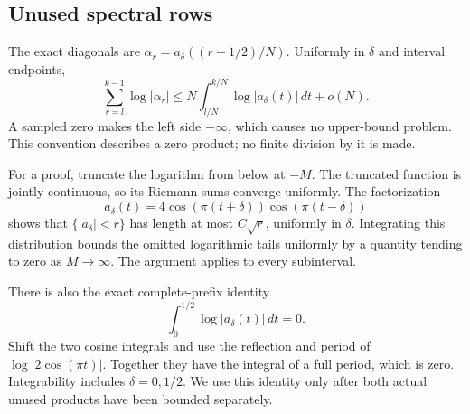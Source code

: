 \subsection{Unused spectral rows}
The exact diagonals are \(\alpha_r=a_\delta((r+1/2)/N)\).
Uniformly in \(\delta\) and interval endpoints,
\begin{equation}\label{lc:riemann}
 \sum_{r=l}^{k-1}\log|\alpha_r|
 \le N\int_{l/N}^{k/N}\log|a_\delta(t)|\,dt+o(N).
\end{equation}
A sampled zero makes the left side \(-\infty\), which causes no
upper-bound problem. This convention describes a zero product;
no finite division by it is made.

For a proof, truncate the logarithm from below at \(-M\).
The truncated function is jointly continuous, so its Riemann sums
converge uniformly. The factorization
\[
 a_\delta(t)=4\cos(\pi(t+\delta))\cos(\pi(t-\delta))
\]
shows that \(\{|a_\delta|<r\}\) has length at most \(C\sqrt r\),
uniformly in \(\delta\). Integrating this distribution bounds the
omitted logarithmic tails uniformly by a quantity tending to zero
as \(M\to\infty\). The argument applies to every subinterval.

There is also the exact complete-prefix identity
\begin{equation}\label{lc:prefix-zero}
                   \int_0^{1/2}\log|a_\delta(t)|\,dt=0 .
\end{equation}
Shift the two cosine integrals and use the reflection and period
of \(\log|2\cos(\pi t)|\). Together they have the integral of a full
period, which is zero. Integrability includes \(\delta=0,1/2\).
We use this identity only after both actual unused products have
been bounded separately.

